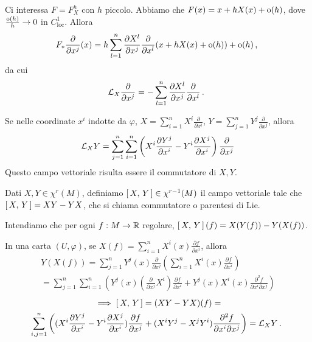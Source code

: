 Ci interessa $F=F_X^h$ con $h$ piccolo. Abbiamo che $F(x)=x+hX(x)+\mathrm{o}(h)$, dove $\frac{\mathrm{o}(h)}{h}\to 0$ in $C^1_{\text{loc}}$.
Allora
\begin{equation*}F_*\frac\partial{\partial x^j}(x)=h\sum_{l=1}^n \frac{\partial X^l}{\partial x^j}\frac\partial{\partial x^l}(x+hX(x)+\mathrm{o}(h))+\mathrm{o}(h)\, \text{, }\end{equation*}
da cui
\begin{equation*}
	\mathcal L_X\frac\partial{\partial x^j}=-\sum_{l=1}^n \frac{\partial X^l}{\partial x^j}\frac\partial{\partial x^l}\, \text{. }
\end{equation*}

Se nelle coordinate $x^i$ indotte da $\varphi$, $X=\sum_{i=1}^n X^i\frac\partial{\partial x^i}$, $Y=\sum_{j=1}^n Y^j\frac\partial{\partial x^j}$, allora
\begin{equation*}
	\mathcal L_XY=\sum_{j=1}^n\sum_{i=1}^n \left(X^i\frac{\partial Y^j}{\partial x^i}-Y^i\frac{\partial X^j}{\partial x^i}\right)\frac\partial{\partial x^j}
\end{equation*}
Questo campo vettoriale risulta essere il commutatore di $X,Y$.

\begin{definition}
Dati $X,Y\in\chi^r(M)$, definiamo $\left[\,X,\,Y\,\right]\in\chi^{r-1}(M)$ il campo vettoriale tale che $\left[\,X,\,Y\,\right]=XY-YX$, che si chiama commutatore o parentesi di Lie.

Intendiamo che per ogni $f:M\to\mathbb R$ regolare, $\left[\,X,\,Y\,\right](f)=X(Y(f))-Y(X(f))$.
\end{definition}

In una carta $(U,\varphi)$, se $X(f)=\sum_{i=1}^n X^i(x)\frac{\partial f}{\partial x^i}$, allora
\begin{multline*}
	Y(X(f))=\sum_{j=1}^nY^j(x)\frac\partial{\partial x^j}\left( \sum_{i=1}^n X^i(x)\frac{\partial f}{\partial x^i} \right)\\
	= \sum_{j=1}^n \sum_{i=1}^n \left( Y^j(x) (\frac{\partial}{\partial x^j}X^i)\frac{\partial f}{\partial x^i} +Y^j(x)X^i(x)\frac{\partial^2 f}{\partial x^i\partial x^j} \right)
\end{multline*}
\begin{multline*}
	\implies \left[\,X,\,Y\,\right] = (XY-YX)(f)=\\
	\sum_{i,j=1}^n\left((X^i\frac{\partial Y^j}{\partial x^i}-Y^i\frac{\partial X^j}{\partial x^i})\frac{\partial f}{\partial x^j} +(X^iY^j-X^jY^i)\frac{\partial^2 f}{\partial x^i\partial x^j}  \right)=\mathcal L_XY \, \text{. }
\end{multline*}

